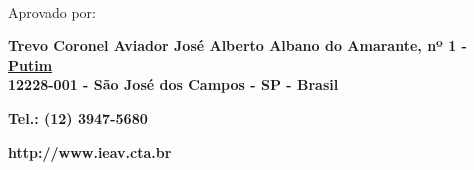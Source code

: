 \begin{titlepage}
\begin{center}
{\begin{minipage}[c]{0.9\textwidth}
\begin{center}
 \textsc{\reviewers}\\
 Aprovado por:\\
 \textsc{\approvers} 
\par\end{center}%
\end{minipage}} %
 \vfill{}
 \textbf{\footnotesize %
Trevo Coronel Aviador José Alberto Albano do Amarante, nº 1 - \underline{Putim}
}\\
 \textbf{ 12228-001 - São José dos Campos - SP - Brasil } \par \end{center}\par \textbf{Tel.:
(12) 3947-5680 }\par \textbf{http://www.ieav.cta.br}\vspace{0.5cm}
\end{titlepage}%

